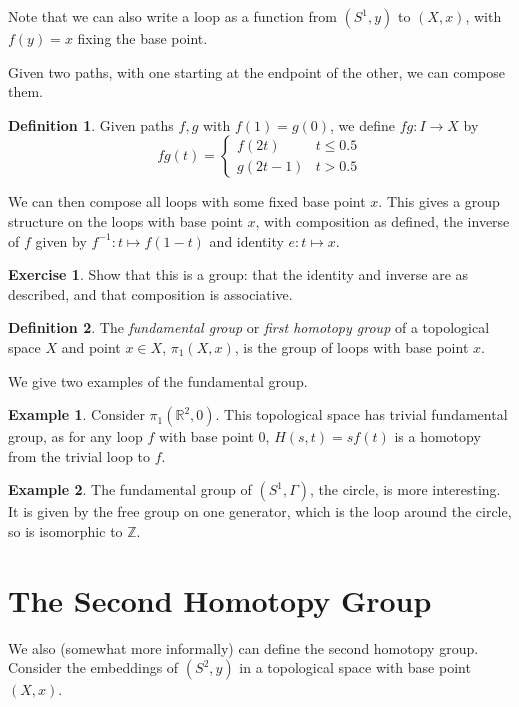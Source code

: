 \documentclass[a4paper,12pt]{article}
\newcommand{\ZZ}{\mathbb{Z}}
\newcommand{\RR}{\mathbb{R}}
\theoremstyle{definition}
\newtheorem*{defn}{Definition}
\newtheorem*{exer}{Exercise}
\newtheorem*{example}{Example}
\begin{document}
Note that we can also write a loop as a function from $(S^1, y)$ to $(X, x)$, with $f(y) = x$ fixing the base point.

Given two paths, with one starting at the endpoint of the other, we can compose them.

\begin{defn}
Given paths $f, g$ with $f(1) = g(0)$, we define $fg: I\to X$ by
$$fg(t) = \begin{cases}f(2t) & t\leq 0.5\\ g(2t-1) & t > 0.5\end{cases}$$
\end{defn}

We can then compose all loops with some fixed base point $x$.
This gives a group structure on the loops with base point $x$, with composition as defined, the inverse of $f$ given by $f^{-1}: t\mapsto f(1-t)$ and identity $e: t\mapsto x$.

\begin{exer}
Show that this is a group: that the identity and inverse are as described, and that composition is associative.
\end{exer}

\begin{defn}
The \emph{fundamental group} or \emph{first homotopy group} of a topological space $X$ and point $x\in X$, $\pi_1(X, x)$, is the group of loops with base point $x$.
\end{defn}

We give two examples of the fundamental group.

\begin{example}
Consider $\pi_1(\RR^2, 0)$.
This topological space has trivial fundamental group, as for any loop $f$ with base point 0, $H(s, t) = sf(t)$ is a homotopy from the trivial loop to $f$.
\end{example}

\begin{example}
The fundamental group of $(S^1, \Gamma)$, the circle, is more interesting.
It is given by the free group on one generator, which is the loop around the circle, so is isomorphic to $\ZZ$.
\end{example}

\section{The Second Homotopy Group}

We also (somewhat more informally) can define the second homotopy group.
Consider the embeddings of $(S^2, y)$ in a topological space with base point $(X, x)$.
\end{document}
